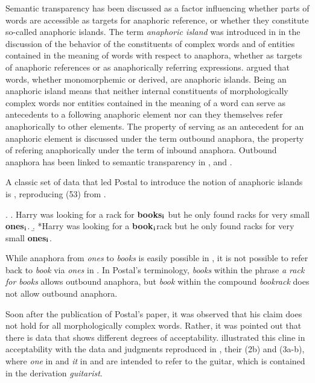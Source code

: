 Semantic transparency has been discussed as a factor influencing whether parts
of words are accessible as targets for anaphoric reference, or whether
they constitute so-called anaphoric
islands.
The term \emph{anaphoric island} was introduced in \citet{Postal:1969}
in the discussion of the behavior of the constituents of complex words and of
entities contained in the meaning of words with respect to anaphora,
whether as targets of anaphoric references or as anaphorically referring
expressions. 
\citet{Postal:1969} argued that words,
whether monomorphemic or derived, are anaphoric islands. Being an
anaphoric island means that neither internal constituents of morphologically complex words nor
entities contained in the meaning of a word can serve as antecedents to a following anaphoric element nor can
they themselves refer anaphorically to other elements. 
The property of serving as an
antecedent for an anaphoric element is discussed under the term outbound anaphora, the
 property of refering anaphorically
under the term of inbound anaphora. Outbound anaphora has been linked
to semantic transparency in \citet{Coulmas:1988}, \citet{Wardetal:1991} and
\citet{Schaefer:2011}. 

A classic set of data that led Postal to introduce the notion of
anaphoric islands is \Next, reproducing (53) from \citet{Postal:1969}.


\ex. \a. Harry was looking for a rack for \textbf{books}$_\text{\textbf{i}}$ but he only found racks for very small \textbf{ones}$_\text{\textbf{i}}$.
\b. *Harry was looking for a \textbf{book}$_\text{\textbf{i}}$rack but he only found racks for very
small \textbf{ones}$_\text{\textbf{i}}$.

While anaphora from \emph{ones} to \emph{books} is easily possible in
\Last[a], it is not possible to refer back to \emph{book} via
\emph{ones} in \Last[b]. In Postal's terminology, \emph{books} within the
phrase \emph{a rack for books} allows
outbound anaphora, but \emph{book} within the compound \emph{bookrack}
does not allow outbound anaphora.

Soon after the publication of Postal's paper, it was observed that his
claim does not hold for all morphologically complex words. Rather, it
was pointed out that there is data that shows different degrees of
acceptability. \citet{LakoffandRoss:1972} illustrated this cline in
acceptability with the data and judgments reproduced in \Next, their
(2b) and (3a-b), where \emph{one} in \Next[a] and \emph{it} in
\Next[b] and \Next[c] are intended to refer to the guitar, which is
contained in the derivation \emph{guitarist}.

